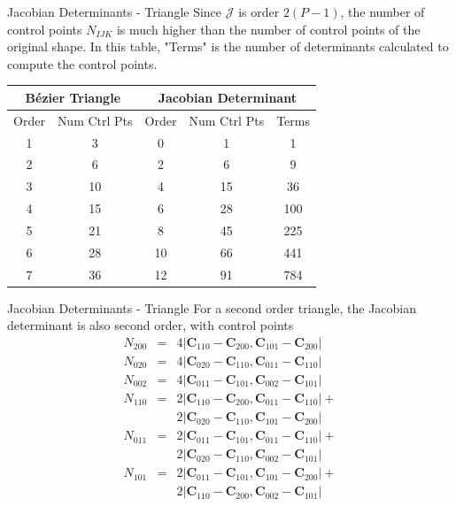 \documentclass[12pt]{beamer}
\begin{document}
\begin{frame}{Jacobian Determinants - Triangle}
Since $\mathcal{J}$ is order $2(P-1)$, the number of control points $N_{IJK}$ is much higher than the number of control points of the original shape. In this table, "Terms" is the number of determinants calculated to compute the control points.

\begin{tabular}{|cc|ccc|}
\hline \multicolumn{2}{|c|}{B{\'e}zier Triangle} & \multicolumn{3}{|c|}{Jacobian Determinant} \\ \hline
Order & Num Ctrl Pts & Order & Num Ctrl Pts & Terms \\ 
\hline 1 & 3 & 0 & 1 & 1 \\
2 & 6 & 2 & 6 & 9 \\
3 & 10 & 4 & 15 & 36 \\
4 & 15 & 6 & 28 & 100 \\
5 & 21 & 8 & 45 & 225 \\
6 & 28 & 10 & 66 & 441 \\
7 & 36 & 12 & 91 & 784 \\ \hline
\end{tabular}
\end{frame}

\begin{frame}{Jacobian Determinants - Triangle}
For a second order triangle, the Jacobian determinant is also second order, with control points
\begin{eqnarray*}
N_{200}&=&4\left|\mathbf{C}_{110}-\mathbf{C}_{200},\mathbf{C}_{101}-\mathbf{C}_{200}\right|
\\N_{020}&=&4\left|\mathbf{C}_{020}-\mathbf{C}_{110},\mathbf{C}_{011}-\mathbf{C}_{110}\right|
\\N_{002}&=&4\left|\mathbf{C}_{011}-\mathbf{C}_{101},\mathbf{C}_{002}-\mathbf{C}_{101}\right|
\\N_{110}&=&2\left|\mathbf{C}_{110}-\mathbf{C}_{200},\mathbf{C}_{011}-\mathbf{C}_{110}\right|+\\&&2\left|\mathbf{C}_{020}-\mathbf{C}_{110},\mathbf{C}_{101}-\mathbf{C}_{200}\right|
\\N_{011}&=&2\left|\mathbf{C}_{011}-\mathbf{C}_{101},\mathbf{C}_{011}-\mathbf{C}_{110}\right|+\\&&2\left|\mathbf{C}_{020}-\mathbf{C}_{110},\mathbf{C}_{002}-\mathbf{C}_{101}\right|
\\N_{101}&=&2\left|\mathbf{C}_{011}-\mathbf{C}_{101},\mathbf{C}_{101}-\mathbf{C}_{200}\right|+\\&&2\left|\mathbf{C}_{110}-\mathbf{C}_{200},\mathbf{C}_{002}-\mathbf{C}_{101}\right|
\end{eqnarray*}
\end{frame}
\end{document}
